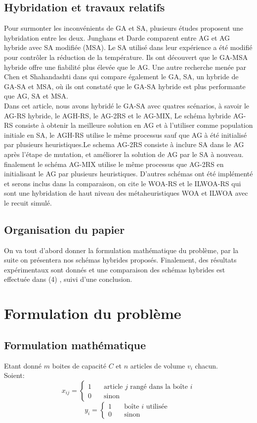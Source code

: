 \documentclass[preprint]{elsarticle}
\begin{document}
\subsection{Hybridation et travaux relatifs}
Pour surmonter les inconvénients  de GA et SA, plusieurs études proposent une hybridation entre les deux.
Junghans et Darde \cite{Junghans} comparent entre AG et AG hybride avec SA modifiée (MSA).
 Le SA utilisé dans leur expérience a été modifié pour contrôler la réduction de la température.
 Ils ont découvert que le GA-MSA hybride offre une fiabilité plus élevée que le AG.
 Une autre recherche menée par Chen et Shahandashti dans \cite{Chen} qui compare également le GA, SA, un hybride de GA-SA et MSA, où ils ont constaté que le GA-SA hybride est plus performante que AG, SA et MSA. \\
Dans cet article, nous avons hybridé le GA-SA avec quatres scénarios, à savoir le AG-RS hybride, le AGH-RS, le AG-2RS et le AG-MIX, Le schéma hybride AG-RS consiste à obtenir la meilleure solution en AG et à l'utiliser comme population initiale en SA,
le AGH-RS utilise le même processus sauf que AG à été initialisé par plusieurs heuristiques.Le schema AG-2RS  consiste à inclure SA dans le AG après l’étape de mutation, et améliorer la solution de AG par le SA à nouveau. finalement le schéma AG-MIX utilise le même processus que AG-2RS en initialisant le AG par plusieurs heuristiques. 
D’autres schémas ont été implémenté et serons inclus dans la comparaison, on cite le WOA-RS  et le ILWOA-RS qui sont une hybridation de haut niveau des métaheuristiques WOA\cite{WOA} et ILWOA\cite{ILWOA} avec le recuit simulé.

 
 \subsection{Organisation du papier}
 On va tout d’abord donner la formulation mathématique du problème, par la suite on présentera nos schémas hybrides proposés. Finalement, des résultats expérimentaux sont donnés et une comparaison des schémas hybrides est effectuée  dans (4) , suivi d’une conclusion.

\section{Formulation du problème}
\subsection{Formulation mathématique}
Etant donné \(m\) boites de capacité \(C\) et \(n\) articles de volume \(v_i\) chacun. \\
    Soient: 
    \[ x_{ij} =
        \begin{cases}
            1  & \quad \text{article } j \text{ rangé dans la boîte } i \\
            0  & \quad \text{sinon } 
        \end{cases}
    \]
    \[ y_i =
    \begin{cases}
        1  & \quad \text{boîte } i \text{ utilisée } \\
        0  & \quad \text{sinon } 
    \end{cases}
    \]
\end{document}
